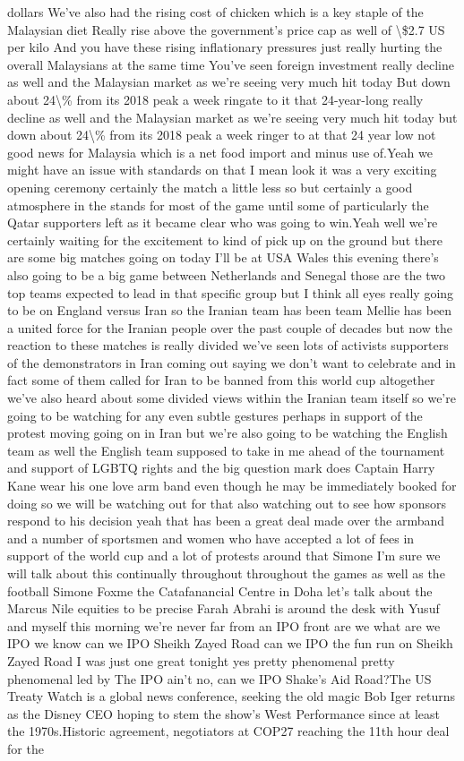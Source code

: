 \documentclass{article}%
\begin{document}
dollars We've also had the rising cost of chicken which is a key staple of the Malaysian diet Really rise above the government's price cap as well of \textbackslash{}\$2.7 US per kilo And you have these rising inflationary pressures just really hurting the overall Malaysians at the same time You've seen foreign investment really decline as well and the Malaysian market as we're seeing very much hit today But down about 24\textbackslash{}\% from its 2018 peak a week ringate to it that 24{-}year{-}long  really decline as well and the Malaysian market as we're seeing very much hit today but down about 24\textbackslash{}\% from its 2018 peak a week ringer to at that 24 year low not good news for Malaysia which is a net food import and minus use of.Yeah we might have an issue with standards on that I mean look it was a very exciting opening ceremony certainly the match a little less so but certainly a good atmosphere in the stands for most of the game until some of particularly the Qatar supporters left as it became clear who was going to win.Yeah well we're certainly waiting for the excitement to kind of pick up on the ground but there are some big matches going on today I'll be at USA Wales this evening there's also going to be a big game between Netherlands and Senegal those are the two top teams expected to lead in that specific group but I think all eyes really going to be on England versus Iran so the Iranian team has been team Mellie has been a united force for the Iranian people over the past couple of decades but now the reaction to these matches is really divided we've seen lots of activists supporters of the demonstrators in Iran coming out saying we don't want to celebrate and in fact some of them called for Iran to be banned from this world cup altogether we've also heard about some divided views within the Iranian team itself so we're going to be watching for any even subtle gestures perhaps in support of the protest moving going on in Iran but we're also going to be watching the English team as well the English team supposed to take in me ahead of the tournament and support of LGBTQ rights and the big question mark does Captain Harry Kane wear his one love arm band even though he may be immediately booked for doing so we will be watching out for that also watching out to see how sponsors respond to his decision yeah that has been a great deal made over the armband and a number of sportsmen and women who have accepted a lot of fees in support of the world cup and a lot of protests around that Simone I'm sure we will talk about this continually throughout throughout the games as well as the football Simone Foxme the Catafanancial Centre in Doha let's talk about the Marcus Nile equities to be precise Farah Abrahi is around the desk with Yusuf and myself this morning we're never far from an IPO front are we what are we IPO we know can we IPO Sheikh Zayed Road can we IPO the fun run on Sheikh Zayed Road I was just one great tonight yes pretty phenomenal pretty phenomenal led by  The IPO ain't no, can we IPO Shake's Aid Road?The US Treaty Watch is a global news conference, seeking the old magic Bob Iger returns as the Disney CEO hoping to stem the show's West Performance since at least the 1970s.Historic agreement, negotiators at COP27 reaching the 11th hour deal for the 
\end{document}

